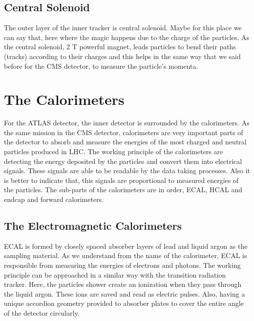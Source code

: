 \documentclass[a4paper,9pt]{article}
\begin{document}
\subsection{Central Solenoid}
The outer layer of the inner tracker is central solenoid. Maybe for this place we can say that, here where the magic happens due to the
charge of the particles. As the central solenoid, 2 T powerful magnet, leads particles to bend their paths (tracks) according to their
charges and this helps in the same way that we said before for the CMS detector, to measure the particle's momenta.

\section{The Calorimeters}

For the ATLAS detector, the inner detector is surrounded by the calorimeters.
As the same mission in the CMS detector, calorimeters are very important
parts of the detector to absorb and measure the energies of the most
charged and neutral particles produced in LHC. The working principle 
of the calorimeters are detecting the energy deposited by the particles 
and convert them into electrical signals. These signals are able to be readable
by the data taking processes. Also it is better to indicate that, this
signals are proportional to measured energies of the particles.
The sub-parts of the calorimeters are in order, ECAL, HCAL and
endcap and forward calorimeters.

\subsection{The Electromagnetic Calorimeters}
ECAL is formed by closely spaced absorber layers of lead and liquid 
argon as the sampling material. As we understand from the name of the
calorimeter, ECAL is responsible from measuring the energies of electrons
and photons. The working principle can be approached in a similar
way with the transition radiation tracker. Here, the particles shower create
an ionization when they pass through the liquid argon. These ions are saved and read as
electric pulses. Also, having a unique accordion geometry provided to
absorber plates to cover the entire angle of the detector circularly.
\end{document}
